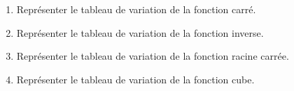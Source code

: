\documentclass[a4paper,12pt]{article}
\begin{document}
\begin{enumerate}
  \item Représenter le tableau de variation de la fonction carré. \par
  \item Représenter le tableau de variation de la fonction inverse. \par
  \item Représenter le tableau de variation de la fonction racine carrée. \par
  \item Représenter le tableau de variation de la fonction cube. \par
\end{enumerate}
\end{document}
